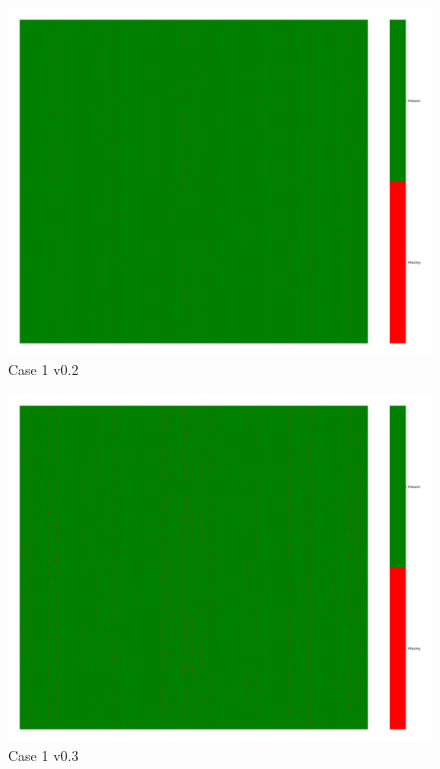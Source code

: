 \documentclass[a4paper,12pt]{article}
\begin{document}
\begin{figure}[H]
    \includegraphics[width=\linewidth]{case1_v0.2_heatmap_cleaned.png}
    \caption*{Case 1 v0.2}
\end{figure}

\begin{figure}[H]
    \includegraphics[width=\linewidth]{case1_v0.3_heatmap_cleaned.png}
    \caption*{Case 1 v0.3}
\end{figure}
\end{document}
